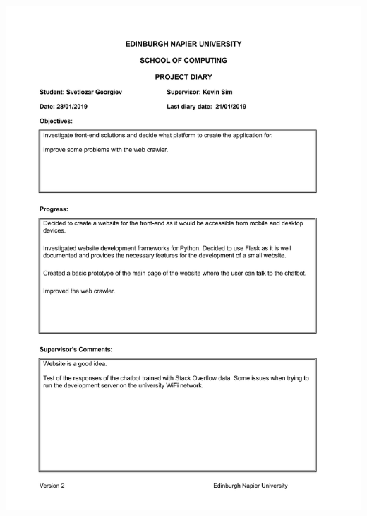 \documentclass[12pt,a4paper]{article}
\begin{document}
\begin{appendices}
\includegraphics[width=\textwidth,height=\textheight,keepaspectratio]{s2week3.jpg}
\newpage

\end{appendices}
\end{document}
